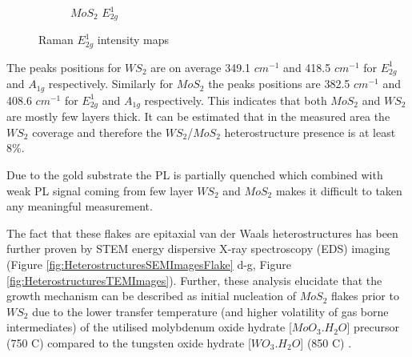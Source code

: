 \begin{figure}[h]
\begin{center}
\begin{subfigure}[b]{0.45\textwidth}
			\caption{$MoS_2$ $E^1_{2g}$}
			\label{fig:HeterostructuresRamanIntensityEMoAu}
		\end{subfigure}
		\caption{Raman $E^1_{2g}$ intensity maps}
		\label{fig:HeterostructuresRamanIntensityEMaps}
	\end{center}
\end{figure}

The peaks positions for $WS_2$ are on average 349.1 $cm^{-1}$ and 418.5 $cm^{-1}$ for $E^1_{2g}$ and $A_{1g}$ respectively. Similarly for $MoS_2$ the peaks positions are 382.5 $cm^{-1}$ and 408.6 $cm^{-1}$ for $E^1_{2g}$ and $A_{1g}$ respectively. This indicates that both $MoS_2$ and $WS_2$ are mostly few layers thick. It can be estimated that in the measured area the $WS_2$ coverage and therefore the $WS_2$/$MoS_2$ heterostructure presence is at least 8{\%}.

Due to the gold substrate the PL is partially quenched which combined with weak PL signal coming from few layer $WS_2$ and $MoS_2$ makes it difficult to taken any meaningful measurement.


The fact that these flakes are epitaxial van der Waals heterostructures has been further proven by STEM energy dispersive X-ray spectroscopy (EDS) imaging (Figure \ref{fig:HeterostructuresSEMImagesFlake} d-g, Figure \ref{fig:HeterostructuresTEMImages}). Further, these analysis elucidate that the growth mechanism can be described as initial nucleation of $MoS_2$ flakes prior to $WS_2$ due to the lower transfer temperature (and higher volatility of gas borne intermediates) of the utilised molybdenum oxide hydrate [$MoO_3.H_2O$] precursor (750 {\degree}C) compared to the tungsten oxide hydrate [$WO_3.H_2O$] (850 {\degree}C) \cite{Sahoo2018}\cite{Freedman1959}. 

